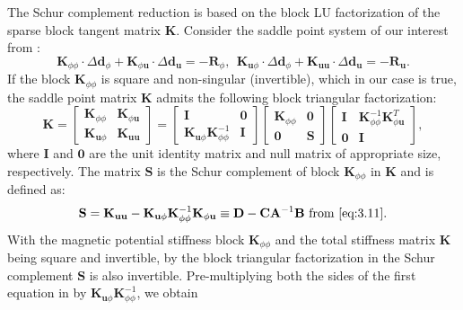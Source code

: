 The Schur complement reduction is based on the block LU factorization of the sparse block tangent matrix $\mathbf{K}$. Consider the saddle point system of our interest  from :
\begin{equation}
\mathbf{K}_{\phi \phi} \cdot \Delta \mathbf{d}_{\phi} + \mathbf{K}_{\phi \mathbf{u}} \cdot \Delta \mathbf{d}_{\mathbf{u}} = -\mathbf{R}_{\phi}, \ \ \mathbf{K}_{\mathbf{u} \phi} \cdot \Delta \mathbf{d}_{\phi} + \mathbf{K}_{\mathbf{u} \mathbf{u}} \cdot \Delta \mathbf{d}_{\mathbf{u}} = -\mathbf{R}_{\mathbf{u}}. 
\label{eq:3.16}
\end{equation}
If the block $\mathbf{K}_{\phi \phi}$ is square and non-singular (invertible), which in our case is true, the saddle point matrix $\mathbf{K}$ admits the following block triangular factorization:
\begin{equation}
\mathbf{K} = 
\begin{bmatrix}
\mathbf{K}_{\phi \phi} & \mathbf{K}_{\phi \mathbf{u}} \\
\mathbf{K}_{\mathbf{u} \phi} & \mathbf{K}_{\mathbf{u} \mathbf{u}}
\end{bmatrix} 
= 
\begin{bmatrix}
\mathbf{I} & \mathbf{0} \\
\mathbf{K}_{\mathbf{u} \phi} \mathbf{K}_{\phi \phi}^{-1} & \mathbf{I}
\end{bmatrix}
\begin{bmatrix}
\mathbf{K}_{\phi \phi} & \mathbf{0} \\
\mathbf{0} & \mathbf{S}
\end{bmatrix}
\begin{bmatrix}
\mathbf{I} & \mathbf{K}_{\phi \phi}^{-1} \mathbf{K}_{\phi \mathbf{u}}^T \\
\mathbf{0} & \mathbf{I}
\end{bmatrix},
\label{eq:3.17}
\end{equation} 
where $\mathbf{I}$  and $\mathbf{0}$ are the unit identity matrix and null matrix of appropriate size, respectively. The matrix $\mathbf{S}$ is the Schur complement of block $\mathbf{K}_{\phi \phi}$ in $\mathbf{K}$ and is defined as:
\begin{equation}
\mathbf{S} = \mathbf{K}_{\mathbf{u} \mathbf{u}} - \mathbf{K}_{\mathbf{u} \phi} \mathbf{K}_{\phi \phi}^{-1} \mathbf{K}_{\phi \mathbf{u}} \equiv \mathbf{D} - \mathbf{C} \mathbf{A}^{-1} \mathbf{B} \ \text{from \Cref{eq:3.11}}.
\label{eq:3.18}
\end{equation}
With the magnetic potential stiffness block $\mathbf{K}_{\phi \phi}$ and the total stiffness matrix $\mathbf{K}$ being square and invertible, by the block triangular factorization in  the Schur complement $\mathbf{S}$ is also invertible. Pre-multiplying both the sides of the first equation in  by $\mathbf{K}_{\mathbf{u} \phi} \mathbf{K}_{\phi \phi}^{-1}$, we obtain
